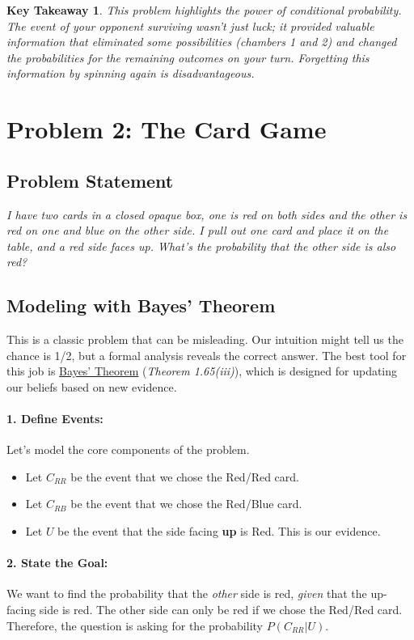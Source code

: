 \documentclass[11pt,a4paper]{article}
\theoremstyle{tutorstyle}
\newtheorem*{takeaway}{Key Takeaway}
\newcommand{\concept}[2]{\hyperref[#1]{#2}}
\begin{document}
\begin{takeaway}
This problem highlights the power of conditional probability. The event of your opponent surviving wasn't just luck; it provided valuable information that eliminated some possibilities (chambers 1 and 2) and changed the probabilities for the remaining outcomes on your turn. Forgetting this information by spinning again is disadvantageous.
\end{takeaway}

\newpage

\section{Problem 2: The Card Game}

\subsection{Problem Statement}
\textit{I have two cards in a closed opaque box, one is red on both sides and the other is red on one and blue on the other side. I pull out one card and place it on the table, and a red side faces up. What’s the probability that the other side is also red?}

\subsection{Modeling with Bayes' Theorem}
This is a classic problem that can be misleading. Our intuition might tell us the chance is 1/2, but a formal analysis reveals the correct answer. The best tool for this job is \concept{concept_bayes}{Bayes' Theorem} (\textit{Theorem 1.65(iii)}), which is designed for updating our beliefs based on new evidence.

\paragraph{1. Define Events:}
Let's model the core components of the problem.
\begin{itemize}
    \item Let $C_{RR}$ be the event that we chose the Red/Red card.
    \item Let $C_{RB}$ be the event that we chose the Red/Blue card.
    \item Let $U$ be the event that the side facing \textbf{up} is Red. This is our evidence.
\end{itemize}

\paragraph{2. State the Goal:}
We want to find the probability that the \textit{other} side is red, \textit{given} that the up-facing side is red. The other side can only be red if we chose the Red/Red card. Therefore, the question is asking for the probability $P(C_{RR} | U)$.
\end{document}
